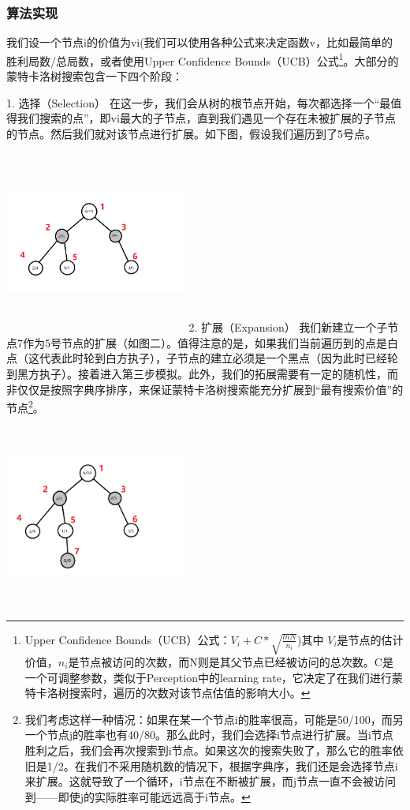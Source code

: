\documentclass[a4paper]{article}
\begin{document}
\begin{multicols}{2}
\subsubsection{算法实现}
我们设一个节点i的价值为vi(我们可以使用各种公式来决定函数v，比如最简单的 胜利局数/总局数，或者使用Upper Confidence Bounds（UCB）公式\footnote{Upper Confidence Bounds（UCB）公式：$V_{i}+C*\sqrt{\frac{lnN}{n_{i}}}$)其中 $V_{i}$是节点的估计价值，$n_{i}$是节点被访问的次数，而N则是其父节点已经被访问的总次数。C是一个可调整参数，类似于Perception中的learning rate，它决定了在我们进行蒙特卡洛树搜索时，遍历的次数对该节点估值的影响大小。\par}。大部分的蒙特卡洛树搜索包含一下四个阶段\cite{k3}：\par
1.	选择（Selection）
在这一步，我们会从树的根节点开始，每次都选择一个“最值得我们搜索的点”，即vi最大的子节点，直到我们遇见一个存在未被扩展的子节点的节点。然后我们就对该节点进行扩展。如下图，假设我们遍历到了5号点。\par\includegraphics[width=6cm,height=6cm]{k1.png}
2.	扩展（Expansion）
我们新建立一个子节点7作为5号节点的扩展（如图二）。值得注意的是，如果我们当前遍历到的点是白点（这代表此时轮到白方执子），子节点的建立必须是一个黑点（因为此时已经轮到黑方执子）。接着进入第三步模拟。此外，我们的拓展需要有一定的随机性，而非仅仅是按照字典序排序，来保证蒙特卡洛树搜索能充分扩展到“最有搜索价值”的节点\footnote{我们考虑这样一种情况：如果在某一个节点i的胜率很高，可能是50/100，而另一个节点j的胜率也有40/80。那么此时，我们会选择i节点进行扩展。当i节点胜利之后，我们会再次搜索到i节点。如果这次的搜索失败了，那么它的胜率依旧是1/2。在我们不采用随机数的情况下，根据字典序，我们还是会选择节点i来扩展。这就导致了一个循环，i节点在不断被扩展，而j节点一直不会被访问到——即使j的实际胜率可能远远高于i节点。}。\par
\includegraphics[width=6cm,height=6cm]{k2.png}

\end{multicols}
\end{document}
